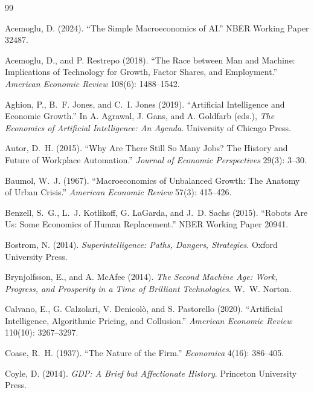 \documentclass[11pt]{article}
\begin{document}
\begin{thebibliography}{99}

Acemoglu, D. (2024). ``The Simple Macroeconomics of AI.'' NBER Working Paper 32487.

Acemoglu, D., and P. Restrepo (2018). ``The Race between Man and Machine: Implications of Technology for Growth, Factor Shares, and Employment.'' \emph{American Economic Review} 108(6): 1488--1542.

Aghion, P., B.~F. Jones, and C.~I. Jones (2019). ``Artificial Intelligence and Economic Growth.'' In A. Agrawal, J. Gans, and A. Goldfarb (eds.), \emph{The Economics of Artificial Intelligence: An Agenda}. University of Chicago Press.

Autor, D.~H. (2015). ``Why Are There Still So Many Jobs? The History and Future of Workplace Automation.'' \emph{Journal of Economic Perspectives} 29(3): 3--30.

Baumol, W.~J. (1967). ``Macroeconomics of Unbalanced Growth: The Anatomy of Urban Crisis.'' \emph{American Economic Review} 57(3): 415--426.

Benzell, S.~G., L.~J. Kotlikoff, G. LaGarda, and J.~D. Sachs (2015). ``Robots Are Us: Some Economics of Human Replacement.'' NBER Working Paper 20941.

Bostrom, N. (2014). \emph{Superintelligence: Paths, Dangers, Strategies}. Oxford University Press.

Brynjolfsson, E., and A. McAfee (2014). \emph{The Second Machine Age: Work, Progress, and Prosperity in a Time of Brilliant Technologies}. W.~W. Norton.

Calvano, E., G. Calzolari, V. Denicol\`o, and S. Pastorello (2020). ``Artificial Intelligence, Algorithmic Pricing, and Collusion.'' \emph{American Economic Review} 110(10): 3267--3297.

Coase, R.~H. (1937). ``The Nature of the Firm.'' \emph{Economica} 4(16): 386--405.

Coyle, D. (2014). \emph{GDP: A Brief but Affectionate History}. Princeton University Press.


\end{thebibliography}
\end{document}
